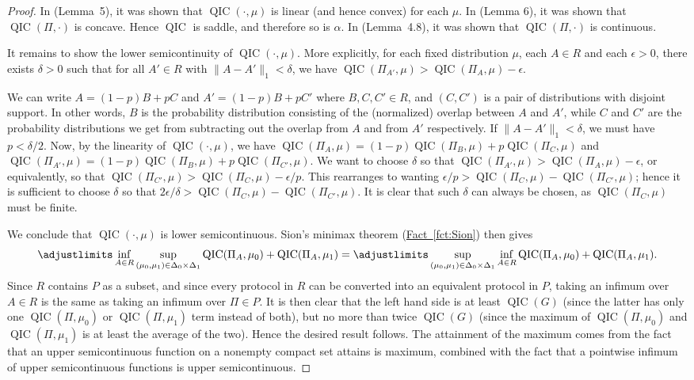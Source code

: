 \documentclass[10pt,a4paper]{article}
\theoremstyle{definition}
\newcommand{\fct}[1]{\hyperref[fct:#1]{Fact~\ref*{fct:#1}}}
\renewcommand{\>}{\rangle}
\newcommand{\<}{\langle}
\DeclareMathOperator{\QIC}{QIC}
\begin{document}
\begin{proof}
In \cite{Tou15} (Lemma~5), it was shown that $\QIC(\cdot,\mu)$
is linear (and hence convex) for each $\mu$. In \cite{Tou15}
(Lemma 6), it was shown that $\QIC(\Pi,\cdot)$ is concave.
Hence $\QIC$ is saddle, and therefore so is $\alpha$.
In \cite{BGK+18} (Lemma~4.8), it was shown that $\QIC(\Pi,\cdot)$
is continuous.

It remains to show the lower semicontinuity of $\QIC(\cdot,\mu)$.
More explicitly, for each fixed distribution $\mu$, each $A\in R$
and each $\epsilon>0$, there exists $\delta>0$ such that
for all $A'\in R$ with $\|A-A'\|_1<\delta$, we have
$\QIC(\Pi_{A'},\mu)>\QIC(\Pi_A,\mu)-\epsilon$.

We can write $A=(1-p)B+pC$
and $A'=(1-p)B+pC'$ where $B,C,C'\in R$, and $(C,C')$
is a pair of distributions with disjoint support. In other words,
$B$ is the probability distribution consisting of the (normalized)
overlap between $A$ and $A'$, while $C$ and $C'$ are the probability
distributions we get from subtracting out the overlap from $A$
and from $A'$ respectively. If $\|A-A'\|_1<\delta$, we must have
$p<\delta/2$. Now, by the linearity of $\QIC(\cdot,\mu)$,
we have
$\QIC(\Pi_A,\mu)=(1-p)\QIC(\Pi_B,\mu)+p\QIC(\Pi_C,\mu)$ and
$\QIC(\Pi_{A'},\mu)=(1-p)\QIC(\Pi_B,\mu)+p\QIC(\Pi_{C'},\mu)$.
We want to choose $\delta$ so that
$\QIC(\Pi_{A'},\mu)>\QIC(\Pi_A,\mu)-\epsilon$,
or equivalently, so that
$\QIC(\Pi_{C'},\mu) > \QIC(\Pi_C,\mu) - \epsilon/p$.
This rearranges to wanting
$\epsilon/p > \QIC(\Pi_C,\mu)-\QIC(\Pi_{C'},\mu)$;
hence it is sufficient to choose $\delta$ so that
$2\epsilon/\delta > \QIC(\Pi_C,\mu)-\QIC(\Pi_{C'},\mu)$.
It is clear that such $\delta$ can always be chosen,
as $\QIC(\Pi_C,\mu)$ must be finite.

We conclude that $\QIC(\cdot,\mu)$ is lower semicontinuous.
Sion's minimax theorem (\fct{Sion}) then gives
\[\adjustlimits\inf_{A\in R}\sup_{(\mu_0,\mu_1)\in\Delta_0\times\Delta_1}
\QIC(\Pi_A,\mu_0)+\QIC(\Pi_A,\mu_1)
=
\adjustlimits\sup_{(\mu_0,\mu_1)\in\Delta_0\times\Delta_1}\inf_{A\in R}
\QIC(\Pi_A,\mu_0)+\QIC(\Pi_A,\mu_1).\]
Since $R$ contains $P$ as a subset, and since every protocol
in $R$ can be converted into an equivalent protocol in $P$, taking
an infimum over $A\in R$ is the same as taking an infimum over $\Pi\in P$.
It is then clear that the left hand side is at least $\QIC(G)$
(since the latter has only one $\QIC(\Pi,\mu_0)$ or $\QIC(\Pi,\mu_1)$
term instead of both), but no more than twice $\QIC(G)$
(since the maximum of $\QIC(\Pi,\mu_0)$ and $\QIC(\Pi,\mu_1)$
is at least the average of the two).
Hence the desired result follows. The attainment of the maximum
comes from the fact that an upper semicontinuous function
on a nonempty compact set attains is maximum, combined
with the fact that a pointwise infimum of upper semicontinuous
functions is upper semicontinuous.
\end{proof}
\end{document}
